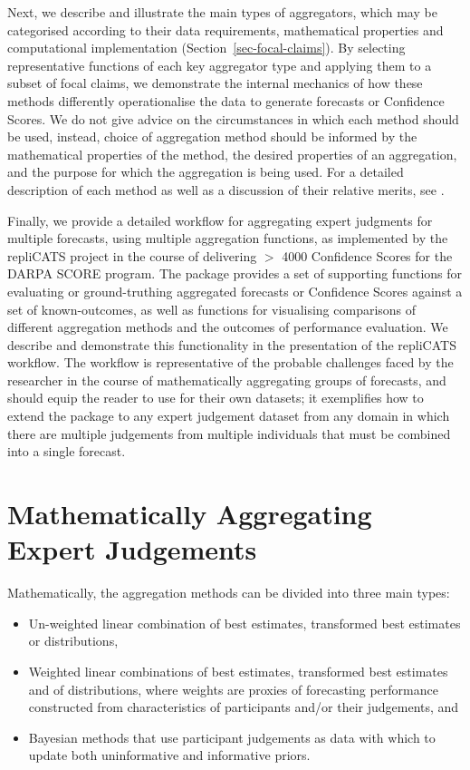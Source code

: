 \documentclass[article]{jss}
\begin{document}
Next, we describe and illustrate the main types of aggregators, which
may be categorised according to their data requirements, mathematical
properties and computational implementation
(Section~\ref{sec-focal-claims}). By selecting representative functions
of each key aggregator type and applying them to a subset of focal
claims, we demonstrate the internal mechanics of how these methods
differently operationalise the data to generate forecasts or Confidence
Scores. We do not give advice on the circumstances in which each method
should be used, instead, choice of aggregation method should be informed
by the mathematical properties of the method, the desired properties of
an aggregation, and the purpose for which the aggregation is being used.
For a detailed description of each method as well as a discussion of
their relative merits, see \citep{Hanea2021}.

Finally, we provide a detailed workflow for aggregating expert judgments
for multiple forecasts, using multiple aggregation functions, as
implemented by the repliCATS project in the course of delivering \(>\)
4000 Confidence Scores for the DARPA SCORE program. The 
package provides a set of supporting functions for evaluating or
ground-truthing aggregated forecasts or Confidence Scores against a set
of known-outcomes, as well as functions for visualising comparisons of
different aggregation methods and the outcomes of performance
evaluation. We describe and demonstrate this functionality in the
presentation of the repliCATS workflow. The workflow is representative
of the probable challenges faced by the researcher in the course of
mathematically aggregating groups of forecasts, and should equip the
reader to use  for their own datasets; it exemplifies how
to extend the  package to any expert judgement dataset
from any domain in which there are multiple judgements from multiple
individuals that must be combined into a single forecast.

\hypertarget{mathematically-aggregating-expert-judgements}{%
\section{Mathematically Aggregating Expert
Judgements}\label{mathematically-aggregating-expert-judgements}}

Mathematically, the aggregation methods can be divided into three main
types:

\begin{itemize}
\item
  Un-weighted linear combination of best estimates, transformed best
  estimates or distributions,
\item
  Weighted linear combinations of best estimates, transformed best
  estimates and of distributions, where weights are proxies of
  forecasting performance constructed from characteristics of
  participants and/or their judgements, and
\item
  Bayesian methods that use participant judgements as data with which to
  update both uninformative and informative priors.
\end{itemize}
\end{document}
